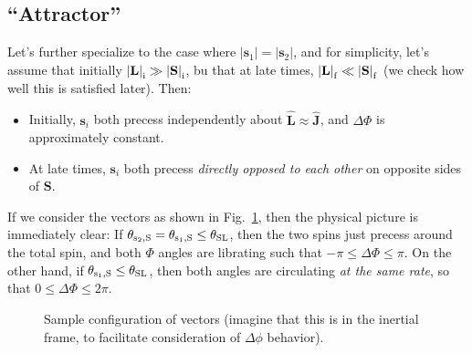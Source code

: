 \documentclass[11pt,
        usenames, %
        dvipsnames %
    ]{article}
\newcommand*{\bm}[1]{\boldsymbol{\mathbf{#1}}}
\newcommand*{\uv}[1]{\hat{\bm{#1}}}
\newcommand*{\abs}[1]{\left|#1\right|}
\begin{document}
\subsection{``Attractor''}

Let's further specialize to the case where $\abs{\bm{s}_1} = \abs{\bm{s}_2}$,
and for simplicity, let's assume that initially $\abs{\bm{L}}_{\rm i} \gg
\abs{\bm{S}}_{\rm i}$, bu that at late times, $\abs{\bm{L}}_{\rm f} \ll
\abs{\bm{S}}_{\rm f}$ (we check how well this is satisfied later). Then:
\begin{itemize}
    \item Initially, $\bm{s}_i$ both precess independently about $\uv{L} \approx
        \uv{J}$, and $\Delta \Phi$ is approximately constant.

    \item At late times, $\bm{s}_i$ both precess \emph{directly opposed to each
        other} on opposite sides of $\bm{S}$.
\end{itemize}
If we consider the vectors as shown in Fig.~\ref{fig:fig}, then the physical
picture is immediately clear: If $\theta_{\rm s_2, S} = \theta_{\rm s_1, S} \leq
\theta_{\rm SL}$, then the two spins just precess around the total spin, and
both $\Phi$ angles are librating such that $-\pi \leq \Delta \Phi \leq \pi$. On
the other hand, if $\theta_{\rm s_1, S} \leq \theta_{\rm SL}$, then both angles
are circulating \emph{at the same rate}, so that $0 \leq \Delta \Phi \leq 2\pi$.
\begin{figure}
    \centering
    \caption{Sample configuration of vectors (imagine that this is in the
    inertial frame, to facilitate consideration of $\Delta \phi$
    behavior).}\label{fig:fig}
\end{figure}
\end{document}
